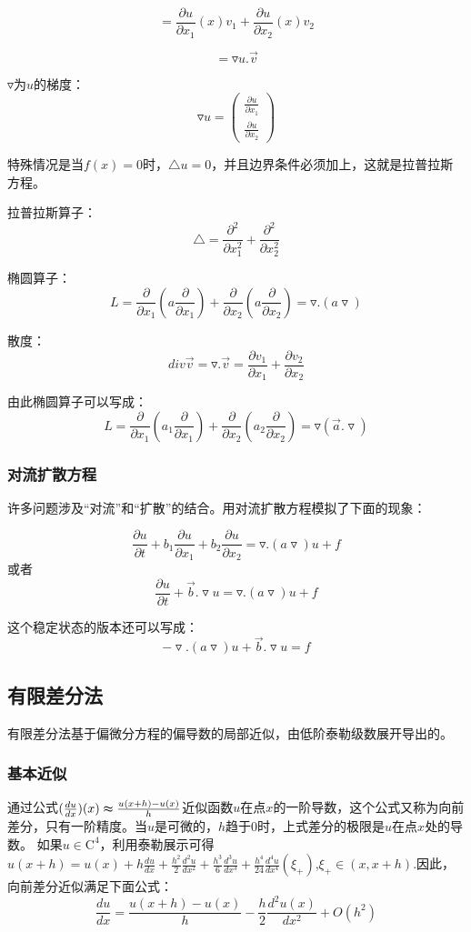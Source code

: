 \documentclass{article}
\begin{document}
 $$=\frac{\partial u}{\partial x_1}(x)v_1+\frac{\partial u}{\partial x_2}(x)v_2$$

 $$=\triangledown u.\vec{v}$$

 $\triangledown$为$u$的梯度：
 $$\triangledown u=\begin{pmatrix}
 \frac{\partial u}{\partial x_1} \\
\frac{\partial u}{\partial x_2}
\end{pmatrix}$$

特殊情况是当$f(x)=0$时，$\triangle u=0$，并且边界条件必须加上，这就是拉普拉斯方程。

拉普拉斯算子：
$$\triangle=\dfrac{\partial ^2}{\partial x_1^2}+\dfrac{\partial ^2}{\partial x_2^2}$$

椭圆算子：
$$L=\dfrac{\partial}{\partial x_1}(a\dfrac{\partial}{\partial x_1})+\dfrac{\partial}{\partial x_2}(a\dfrac{\partial}{\partial x_2})=\triangledown .(a\triangledown)$$

散度：
$$div\vec{v}=\triangledown .\vec{v}=\dfrac{\partial v_1}{\partial x_1}+\dfrac{\partial v_2}{\partial x_2}$$

由此椭圆算子可以写成：
$$L=\dfrac{\partial}{\partial x_1}(a_1\dfrac{\partial}{\partial x_1})+\dfrac{\partial}{\partial x_2}(a_2\dfrac{\partial}{\partial x_2})=\triangledown (\vec a.\triangledown)$$

\subsubsection{对流扩散方程}
许多问题涉及“对流”和“扩散”的结合。用对流扩散方程模拟了下面的现象：

$$\dfrac{\partial u}{\partial t}+b_1\dfrac{\partial u}{\partial x_1}+b_2\dfrac{\partial u}{\partial x_2}=\triangledown .(a\triangledown)u+f$$
或者
$$\dfrac{\partial u}{\partial t}+\vec b.\triangledown u=\triangledown .(a\triangledown)u+f$$

这个稳定状态的版本还可以写成：$$-\triangledown .(a\triangledown)u+\vec b.\triangledown u=f$$

\subsection{有限差分法}
有限差分法基于偏微分方程的偏导数的局部近似，由低阶泰勒级数展开导出的。
\subsubsection{基本近似}
通过公式$(\frac{du}{dx})(x)\thickapprox \frac{u(x+h)-u(x)}{h}$近似函数$u$在点$x$的一阶导数，这个公式又称为向前差分，只有一阶精度。当$u$是可微的，$h$趋于$0$时，上式差分的极限是$u$在点$x$处的导数。
如果$u\in \mathrm{C}^4$，利用泰勒展示可得$u(x+h)=u(x)+h\frac{du}{dx}+\frac{h^2}{2}\frac{d^2u}{dx^2}+\frac{h^3}{6}\frac{d^3u}{dx^3}+\frac{h^4}{24}\frac{d^4u}{dx^4}(\xi _+)$,$\xi _+ \in (x,x+h)$.因此，向前差分近似满足下面公式：
$$\frac{du}{dx}=\frac{u(x+h)-u(x)}{h}-\frac{h}{2}\frac{d^2u(x)}{dx^2}+O(h^2)$$
\end{document}
